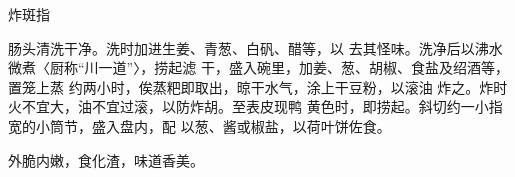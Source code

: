 \begin{recipe}{炸斑指}

\ingredients


\cooking

肠头清洗干净。洗时加进生姜、青葱、白矾、醋等，以 去其怪味。洗净后以沸水微煮〈厨称“川一道”〉，捞起滤 干，盛入碗里，加姜、葱、胡椒、食盐及绍酒等，置笼上蒸 约两小时，俟蒸粑即取出，晾干水气，涂上干豆粉，以滚油 炸之。炸时火不宜大，油不宜过滚，以防炸胡。至表皮现鸭 黄色时，即捞起。斜切约一小指宽的小筒节，盛入盘内，配 以葱、酱或椒盐，以荷叶饼佐食。

\notes

外脆内嫩，食化渣，味道香美。

\end{recipe}

